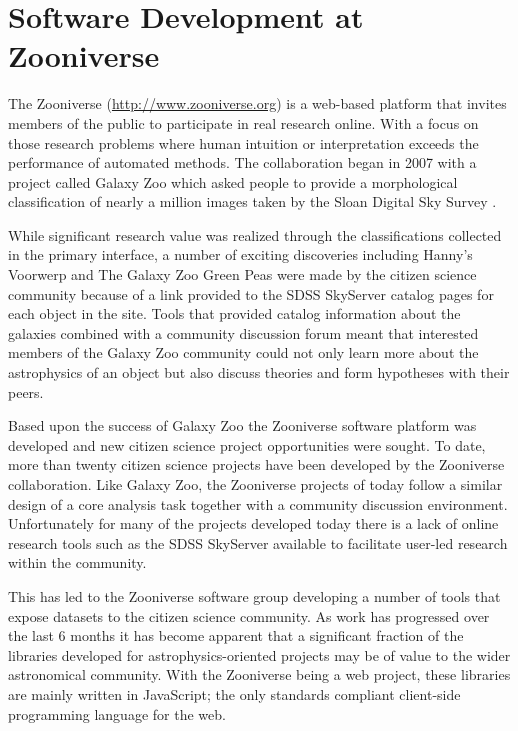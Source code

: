 \section{Software Development at Zooniverse}


The Zooniverse (\url{http://www.zooniverse.org}) is a web-based platform that invites members of the public to participate in real research online. With a focus on those research problems where human intuition or interpretation exceeds the performance of automated methods. The collaboration began in 2007 with a project called Galaxy Zoo \citep{2007AAS...211.9403R} which asked people to provide a morphological classification of nearly a million images taken by the Sloan Digital Sky Survey \citep{2000AJ....120.1579Y}.

While significant research value was realized through the classifications collected in the primary interface, a number of exciting discoveries including Hanny's Voorwerp \citep{2009MNRAS.399..129L} and The Galaxy Zoo Green Peas \citep{2009MNRAS.399.1191C} were made by the citizen science community because of a link provided to the SDSS SkyServer \citep{2002cs........2013S} catalog pages for each object in the site. Tools that provided catalog information about the galaxies combined with a community discussion forum meant that interested members of the Galaxy Zoo community could not only learn more about the astrophysics of an object but also discuss theories and form hypotheses with their peers.

Based upon the success of Galaxy Zoo the Zooniverse software platform was developed and new citizen science project opportunities were sought. To date, more than twenty citizen science projects have been developed by the Zooniverse collaboration. Like Galaxy Zoo, the Zooniverse projects of today follow a similar design of a core analysis task together with a community discussion environment. Unfortunately for many of the projects developed today there is a lack of online research tools such as the SDSS SkyServer available to facilitate user-led research within the community.

This has led to the Zooniverse software group developing a number of tools that expose datasets to the citizen science community. As work has progressed over the last 6 months it has become apparent that a significant fraction of the libraries developed for astrophysics-oriented projects may be of value to the wider astronomical community. With the Zooniverse being a web project, these libraries are mainly written in JavaScript; the only standards compliant client-side programming language for the web.

